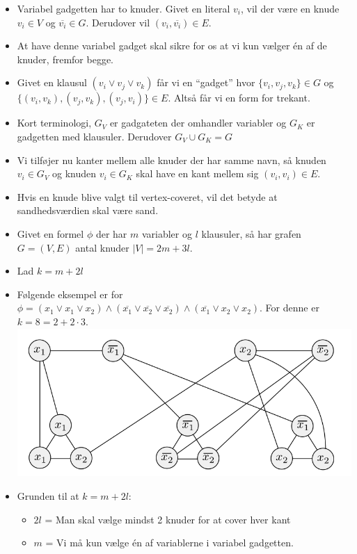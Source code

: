 \begin{frame}[allowframebreaks]
\begin{itemize}
		\item Variabel gadgetten har to knuder. Givet en literal $v_{i}$, vil der være en knude $v_{i} \in V$  og $\overline{v_{i}} \in G$. Derudover vil $(v_{i}, \overline{v_{i}}) \in E$.
		\item At have denne variabel gadget skal sikre for os at vi kun vælger én af de knuder, fremfor begge.
		\item Givet en klausul $(v_{i} \lor v_{j} \lor v_{k})$ får vi en ``gadget'' hvor $\{v_{i}, v_{j}, v_{k}\} \in G$ og $\{(v_{i}, v_{k}), (v_{j}, v_{k}), (v_{j}, v_{i})\} \in E$. Altså får vi en form for trekant.
		\item Kort terminologi, $G_{V}$ er gadgateten der omhandler variabler og $G_{K}$ er gadgetten med klausuler. Derudover $G_{V} \cup G_{K} = G$
		\item Vi tilføjer nu kanter mellem alle knuder der har samme navn, så knuden $v_{i} \in G_{V}$ og knuden $v_{i} \in G_{K}$ skal have en kant mellem sig $(v_{i}, v_{i}) \in E$.
		\item Hvis en knude blive valgt til vertex-coveret, vil det betyde at sandhedsværdien skal være sand.
		\item Givet en formel $\phi$ der har $m$ variabler og $l$ klausuler, så har grafen $G = (V,E)$ antal knuder $|V| = 2m+3l$.
		\item Lad $k = m+2l$
		\item Følgende eksempel er for $\phi = (x_{1} \lor x_{1} \lor x_{2}) \land (\overline{x_{1}} \lor \overline{x_{2}} \lor \overline{x_{2}}) \land (\overline{x_{1}} \lor x_{2} \lor x_{2})$. For denne er $k = 8 = 2 + 2 \cdot 3$.
		      \includegraphics[scale=0.5]{figur/figur745.png}
		\item Grunden til at $k = m+2l$:
		      \begin{itemize}
			      \item $2l$ = Man skal vælge mindst 2 knuder for at cover hver kant
			      \item $m$ = Vi må kun vælge én af variablerne i variabel gadgetten.

\end{itemize}
\end{itemize}
\end{frame}
